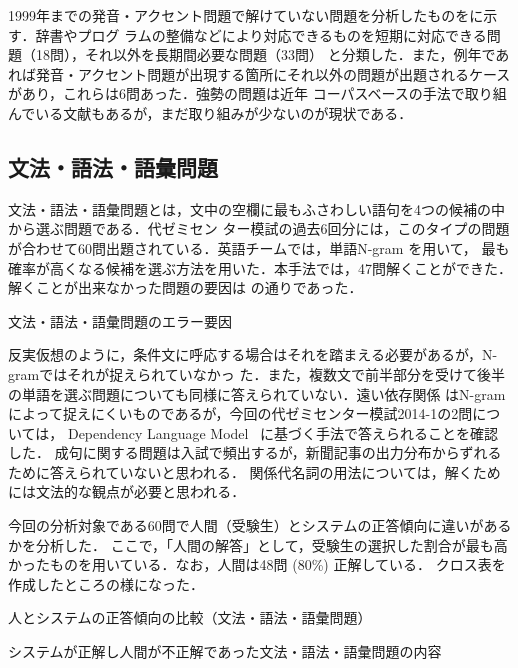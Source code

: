 \documentclass[japanese]{jnlp_1.4b}
\def\TABREF#1{}
\begin{document}
1999年までの発音・アクセント問題で解けていない問題を分析したものを\TABREF{tab:eigo:1ab}に示す．辞書やプログ
ラムの整備などにより対応できるものを短期に対応できる問題（18問），それ以外を長期間必要な問題（33問）
と分類した．また，例年であれば発音・アクセント問題が出現する箇所にそれ以外の問題が出題されるケースがあり，これらは6問あった．強勢の問題は近年
コーパスベースの手法で取り組んでいる文献\cite{kyosei}もあるが，まだ取り組みが少ないのが現状である．


\subsection{文法・語法・語彙問題}
\label{sec:eigo:2a}

文法・語法・語彙問題とは，文中の空欄に最もふさわしい語句を4つの候補の中から選ぶ問題である．代ゼミセン
ター模試の過去6回分には，このタイプの問題が合わせて60問出題されている．英語チームでは，単語N-gram を用いて，
最も確率が高くなる候補を選ぶ方法を用いた．本手法では，47問解くことができた．解くことが出来なかった問題の要因は
\TABREF{tab:eigo:grammar}の通りであった．

\begin{table}[b]
\caption{文法・語法・語彙問題のエラー要因\label{tab:eigo:grammar}}

\end{table}

反実仮想のように，条件文に呼応する場合はそれを踏まえる必要があるが，N-gramではそれが捉えられていなかっ
た．また，複数文で前半部分を受けて後半の単語を選ぶ問題についても同様に答えられていない．遠い依存関係
はN-gram によって捉えにくいものであるが，今回の代ゼミセンター模試2014-1の2問については，
Dependency Language Model~\cite{deplm} に基づく手法で答えられることを確認した．
成句に関する問題は入試で頻出するが，新聞記事の出力分布からずれるために答えられていないと思われる．
関係代名詞の用法については，解くためには文法的な観点が必要と思われる．

今回の分析対象である60問で人間（受験生）とシステムの正答傾向に違いがあるかを分析した．
ここで，「人間の解答」として，受験生の選択した割合が最も高かったものを用いている．なお，人間は48問 (80\%) 正解している．
クロス表を作成したところ\TABREF{tab:eigo:bunpou:cross}の様になった．

\begin{table}[t]
\caption{人とシステムの正答傾向の比較（文法・語法・語彙問題）}
\label{tab:eigo:bunpou:cross}

\end{table}
\begin{table}[t]
\caption{システムが正解し人間が不正解であった文法・語法・語彙問題の内容}
\label{tab:eigo:syshumcompare}

\end{table}
\end{document}
